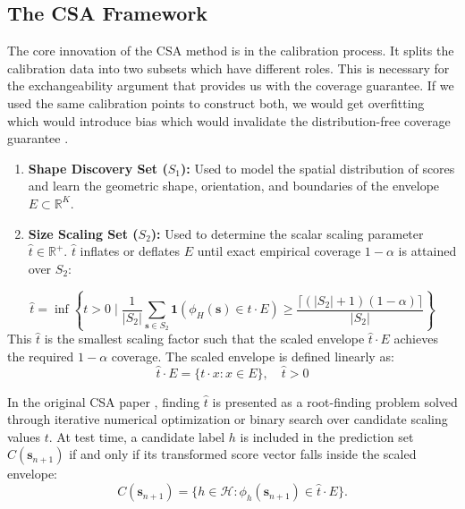 \subsection{The CSA Framework}
\label{sec2.4.2: csa framework}
The core innovation of the CSA method is in the calibration process. It splits the calibration data into
two subsets which have different roles. This is necessary for the exchangeability argument that provides us with the
coverage guarantee. If we used the same calibration points to construct both, we would get overfitting which would 
introduce bias which would invalidate the distribution-free coverage guarantee \cite{ochoarivera2024conformal}.

\begin{enumerate}[label=(\roman*)]
    \item \textbf{Shape Discovery Set ($S_1$):} Used to model the spatial distribution of scores and learn the geometric
          shape, orientation, and boundaries of the envelope $E \subset \mathbb{R}^K$. 
    \item \textbf{Size Scaling Set ($S_2$):} Used to determine the scalar scaling parameter $\hat{t} \in \mathbb{R}^+$. 
          $\hat{t}$ inflates or deflates $E$ until exact empirical coverage $1 - \alpha$ is attained over $S_2$:
\end{enumerate}
 
\begin{equation*}
 \hat{t} = \inf \left\{ t > 0 \;\Big|\; \frac{1}{|S_2|} \sum_{\mathbf{s} \in S_2} \mathbf{1}\left(\phi_H(\mathbf{s}) 
 \in t \cdot E\right) \ge \frac{\lceil (|S_2|+1)(1-\alpha) \rceil}{|S_2|} \right\}
 \end{equation*}
This $\hat t$ is the smallest scaling factor such that the scaled envelope $\hat t \cdot E$ achieves the 
required $1-\alpha$ coverage. The scaled envelope is defined linearly as:
$$\hat t \cdot E = \{ t \cdot x : x \in E \}, \quad \hat t > 0$$

In the original CSA paper \cite{ochoarivera2024conformal}, finding $\hat{t}$ is presented as a root-finding 
problem solved through iterative numerical optimization or binary search over candidate scaling values $t$. At test time, 
a candidate label $h$ is included in the prediction set $C(\mathbf{s}_{n+1})$ if and only if its transformed score 
vector falls inside the scaled envelope: $$C(\mathbf{s}_{n+1}) = \{ h \in \mathcal{H} : \phi_h(\mathbf{s}_{n+1}) \in 
\hat{t} \cdot E \}.$$



